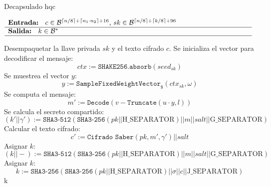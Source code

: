 \begin{algorithm}[H]
	\small
	\caption{Decapsulado \acrshort{hqc}}
	$\begin{array}{p{\textwidth}}
		\textbf{Entrada: } \(c\in \mathcal{B}^{\lceil n/8 \rceil+\lceil n_1\cdot n_2 \rceil+16}\), \(sk\in \mathcal{B}^{\lceil n/8 \rceil+\lceil k/8 \rceil+96}\)\\ 
		\hline
		\textbf{Salida: } \(k\in \mathcal{B}^{*}\)\\ 
		\hline
	\end{array}$
	\begin{algorithmic}[1]
		\State Desempaquetar la llave privada \(sk\) y el texto cifrado \(c\).
		\State Se inicializa el vector para decodificar el mensaje:
		\begin{equation}
			ctx:=\texttt{SHAKE256.absorb}(seed_{sk})
		\end{equation}
		\State Se muestrea el vector \(y\):
		\begin{equation}
			y:=\texttt{SampleFixedWeightVector}_{\$}(ctx_{sk}, \omega)
		\end{equation}
		\State Se computa el mensaje:
		\begin{equation}
			m':=\texttt{Decode}(v-\texttt{Truncate}(u\cdot y,l))
		\end{equation}
		\State Se calcula el secreto compartido:
		\begin{equation}
			(k'||\gamma'):=\texttt{SHA3-512}(\texttt{SHA3-256}(pk||\text{H\_SEPARATOR})||m||salt||{\text{G\_SEPARATOR}})
		\end{equation}
		\State Calcular el texto cifrado:
		\begin{equation}
			c':=\texttt{Cifrado Saber}(pk,m',\gamma')|| salt
		\end{equation}
		\Statex {}
		\State Asignar \(k\):
		\begin{equation}
			(k||-):=\texttt{SHA3-512}(\texttt{SHA3-256}(pk||\text{H\_SEPARATOR})||m||salt||{\text{G\_SEPARATOR}})
		\end{equation}
		\Else
		\State Asignar \(k\):
		\begin{equation}
			k:=\texttt{SHA3-256}(\texttt{SHA3-256}(pk||\text{H\_SEPARATOR})||\sigma||c||{\text{J\_SEPARATOR}})
		\end{equation}
		\EndIf
		\State \Return k
	\end{algorithmic}
\end{algorithm}
\newpage
